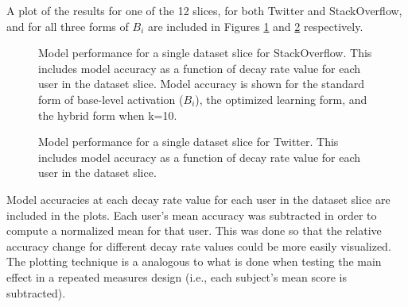 \documentclass[man,floatsintext,donotrepeattitle]{apa6}
\begin{document}
A plot of the results for one of the 12 slices, for both Twitter and StackOverflow, and for all three forms of $B_{i}$ are included in Figures \ref{figPriorSOQSliceDsStd} and \ref{figPriorTwitterSliceDsStd} respectively.

\begin{figure}[!htbp]
  {%
    \setlength{\fboxsep}{0pt}%
    \setlength{\fboxrule}{1pt}%
    \hfill
    \hfill
    \hfill
    \caption{
    Model performance for a single dataset slice for StackOverflow.
    This includes model accuracy as a function of decay rate value for each user in the dataset slice.
    Model accuracy is shown for the standard form of base-level activation ($B_{i}$), the optimized learning form, and the hybrid form when k=10.
  }
    \label{figPriorSOQSliceDsStd}
  }%

\end{figure}

\begin{figure}[!htbp]
  {%
    \setlength{\fboxsep}{0pt}%
    \setlength{\fboxrule}{1pt}%
    \hfill
    \hfill
    \hfill
    \caption{
      Model performance for a single dataset slice for Twitter.
      This includes model accuracy as a function of decay rate value for each user in the dataset slice.
    }
    \label{figPriorTwitterSliceDsStd}
  }%
\end{figure}

Model accuracies at each decay rate value for each user in the dataset slice are included in the plots.
Each user's mean accuracy was subtracted in order to compute a normalized mean for that user.
This was done so that the relative accuracy change for different decay rate values could be more easily visualized.
The plotting technique is a analogous to what is done when testing the main effect in a repeated measures design (i.e., each subject's mean score is subtracted).
\end{document}
